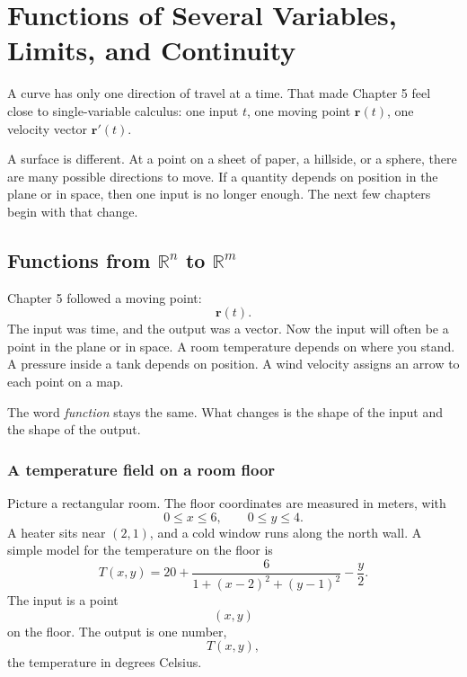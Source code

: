 

\chapter{Functions of Several Variables, Limits, and Continuity}
\label{ch:6}

A curve has only one direction of travel at a time.  That made Chapter 5 feel close to
single-variable calculus: one input \(t\), one moving point \(\mathbf r(t)\), one velocity
vector \(\mathbf r'(t)\).

A surface is different.  At a point on a sheet of paper, a hillside, or a sphere, there are
many possible directions to move.  If a quantity depends on position in the plane or in
space, then one input is no longer enough.  The next few chapters begin with that
change.

\section{Functions from \texorpdfstring{\(\mathbb R^n\)}{Rn} to
\texorpdfstring{\(\mathbb R^m\)}{Rm}}
\label{sec:6.1}

Chapter 5 followed a moving point:
\[
    \mathbf r(t).
\]
The input was time, and the output was a vector.  Now the input will often be a point
in the plane or in space.  A room temperature depends on where you stand.  A pressure
inside a tank depends on position.  A wind velocity assigns an arrow to each point on a
map.

The word \emph{function} stays the same.  What changes is the shape of the input and
the shape of the output.

\subsection{A temperature field on a room floor}

Picture a rectangular room.  The floor coordinates are measured in meters, with
\[
    0\le x\le 6,
    \qquad
    0\le y\le 4.
\]
A heater sits near \((2,1)\), and a cold window runs along the north wall.  A simple
model for the temperature on the floor is
\[
    T(x,y)
    =
    20+\frac{6}{1+(x-2)^2+(y-1)^2}-\frac{y}{2}.
\]
The input is a point
\[
    (x,y)
\]
on the floor.  The output is one number,
\[
    T(x,y),
\]
the temperature in degrees Celsius.

